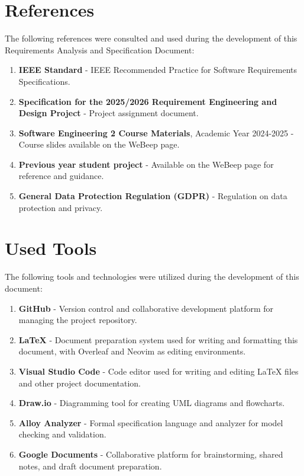 \section{References}
\label{sec:references}%

The following references were consulted and used during the development of this Requirements Analysis and Specification Document:

\begin{enumerate}
    \item \textbf{IEEE Standard} - IEEE Recommended Practice for Software Requirements Specifications.
    \item \textbf{Specification for the 2025/2026 Requirement Engineering and Design Project} - Project assignment document.
    \item \textbf{Software Engineering 2 Course Materials}, Academic Year 2024-2025 - Course slides available on the WeBeep page.
    \item \textbf{Previous year student project} - Available on the WeBeep page for reference and guidance.
    \item \textbf{General Data Protection Regulation (GDPR)} - Regulation on data protection and privacy.
\end{enumerate}

\section{Used Tools}
\label{sec:used_tools}%

The following tools and technologies were utilized during the development of this document:

\begin{enumerate}
    \item \textbf{GitHub} - Version control and collaborative development platform for managing the project repository.
    \item \textbf{\LaTeX{}} - Document preparation system used for writing and formatting this document, with Overleaf and Neovim as editing environments.
    \item \textbf{Visual Studio Code} - Code editor used for writing and editing LaTeX files and other project documentation.
    \item \textbf{Draw.io} - Diagramming tool for creating UML diagrams and flowcharts.
    \item \textbf{Alloy Analyzer} - Formal specification language and analyzer for model checking and validation.
    \item \textbf{Google Documents} - Collaborative platform for brainstorming, shared notes, and draft document preparation.
\end{enumerate}

